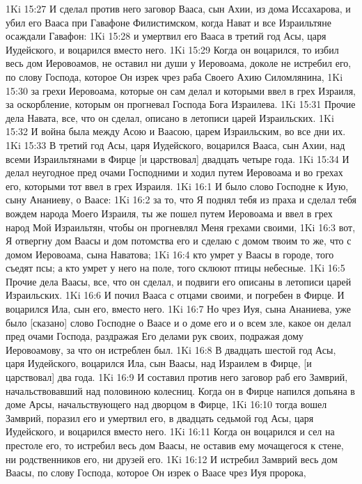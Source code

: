1Ki 15:27  И сделал против него заговор Вааса, сын Ахии, из дома Иссахарова, и убил его Вааса при Гавафоне Филистимском, когда Нават и все Израильтяне осаждали Гавафон:
1Ki 15:28  и умертвил его Вааса в третий год Асы, царя Иудейского, и воцарился вместо него.
1Ki 15:29  Когда он воцарился, то избил весь дом Иеровоамов, не оставил ни души у Иеровоама, доколе не истребил его, по слову Господа, которое Он изрек чрез раба Своего Ахию Силомлянина,
1Ki 15:30  за грехи Иеровоама, которые он сам делал и которыми ввел в грех Израиля, за оскорбление, которым он прогневал Господа Бога Израилева.
1Ki 15:31  Прочие дела Навата, все, что он сделал, описано в летописи царей Израильских.
1Ki 15:32  И война была между Асою и Ваасою, царем Израильским, во все дни их.
1Ki 15:33  В третий год Асы, царя Иудейского, воцарился Вааса, сын Ахии, над всеми Израильтянами в Фирце [и царствовал] двадцать четыре года.
1Ki 15:34  И делал неугодное пред очами Господними и ходил путем Иеровоама и во грехах его, которыми тот ввел в грех Израиля.
1Ki 16:1  И было слово Господне к Иую, сыну Ананиеву, о Ваасе:
1Ki 16:2  за то, что Я поднял тебя из праха и сделал тебя вождем народа Моего Израиля, ты же пошел путем Иеровоама и ввел в грех народ Мой Израильтян, чтобы он прогневлял Меня грехами своими,
1Ki 16:3  вот, Я отвергну дом Ваасы и дом потомства его и сделаю с домом твоим то же, что с домом Иеровоама, сына Наватова;
1Ki 16:4  кто умрет у Ваасы в городе, того съедят псы; а кто умрет у него на поле, того склюют птицы небесные.
1Ki 16:5  Прочие дела Ваасы, все, что он сделал, и подвиги его описаны в летописи царей Израильских.
1Ki 16:6  И почил Вааса с отцами своими, и погребен в Фирце. И воцарился Ила, сын его, вместо него.
1Ki 16:7  Но чрез Иуя, сына Ананиева, уже было [сказано] слово Господне о Ваасе и о доме его и о всем зле, какое он делал пред очами Господа, раздражая Его делами рук своих, подражая дому Иеровоамову, за что он истреблен был.
1Ki 16:8  В двадцать шестой год Асы, царя Иудейского, воцарился Ила, сын Ваасы, над Израилем в Фирце, [и царствовал] два года.
1Ki 16:9  И составил против него заговор раб его Замврий, начальствовавший над половиною колесниц. Когда он в Фирце напился допьяна в доме Арсы, начальствующего над дворцом в Фирце,
1Ki 16:10  тогда вошел Замврий, поразил его и умертвил его, в двадцать седьмой год Асы, царя Иудейского, и воцарился вместо него.
1Ki 16:11  Когда он воцарился и сел на престоле его, то истребил весь дом Ваасы, не оставив ему мочащегося к стене, ни родственников его, ни друзей его.
1Ki 16:12  И истребил Замврий весь дом Ваасы, по слову Господа, которое Он изрек о Ваасе чрез Иуя пророка,
